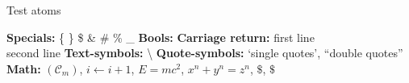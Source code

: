 \begin{algorithm}
\caption{Test atoms}
\begin{algorithmic}
  \STATE \textbf{Specials:} \{ \} \$ \& \# \% \_
  \STATE \textbf{Bools:} \AND \OR \NOT \TRUE \FALSE
  \STATE \textbf{Carriage return:} first line \\ second line
  \STATE \textbf{Text-symbols:} \textbackslash
  \STATE \textbf{Quote-symbols:} `single quotes', ``double quotes''
  \STATE \textbf{Math:} $(\mathcal{C}_m)$, $i \gets i + 1$, $E=mc^2$, \( x^n + y^n = z^n \), $\$$, \(\$\)
\end{algorithmic}
\end{algorithm}
